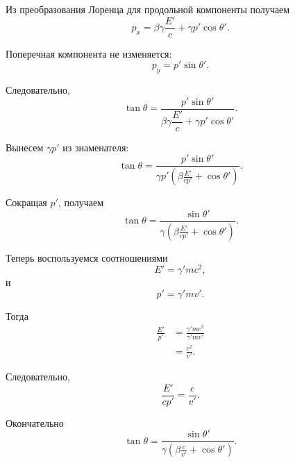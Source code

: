 \documentclass[../final.tex]{subfiles}
\begin{document}
Из преобразования Лоренца для продольной компоненты получаем
%
\begin{equation*}
    p_x
    =
    \beta\gamma\frac{E'}{c}
    +
    \gamma p'\cos\theta'.
\end{equation*}

Поперечная компонента не изменяется:
%
\begin{equation*}
    p_y
    =
    p'\sin\theta'.
\end{equation*}

Следовательно,
%
\begin{equation*}
    \tan\theta
    =
    \frac{
        p'\sin\theta'
    }{
        \beta\gamma\dfrac{E'}{c}
        +
        \gamma p'\cos\theta'
    }.
\end{equation*}

Вынесем $\gamma p'$ из знаменателя:
%
\begin{equation*}
    \tan\theta
    =
    \frac{
        p'\sin\theta'
    }{
        \gamma p'
        \left(
            \beta\frac{E'}{cp'}
            +
            \cos\theta'
        \right)
    }.
\end{equation*}

Сокращая $p'$, получаем
%
\begin{equation*}
    \tan\theta
    =
    \frac{
        \sin\theta'
    }{
        \gamma
        \left(
            \beta\frac{E'}{cp'}
            +
            \cos\theta'
        \right)
    }.
\end{equation*}

Теперь воспользуемся соотношениями
%
\begin{equation*}
    E'
    =
    \gamma' mc^2,
\end{equation*}
%
и
%
\begin{equation*}
    p'
    =
    \gamma' mv'.
\end{equation*}

Тогда
%
\begin{align*}
    \frac{E'}{p'}
    &=
    \frac{
        \gamma'mc^2
    }{
        \gamma'mv'
    }
    \\[3pt]
    &=
    \frac{c^2}{v'}.
\end{align*}

Следовательно,
%
\begin{equation*}
    \frac{E'}{cp'}
    =
    \frac{c}{v'}.
\end{equation*}

Окончательно
%
\begin{equation*}
    \tan\theta
    =
    \frac{
        \sin\theta'
    }{
        \gamma
        \left(
            \beta\frac{c}{v'}
            +
            \cos\theta'
        \right)
    }.
\end{equation*}
\end{document}

